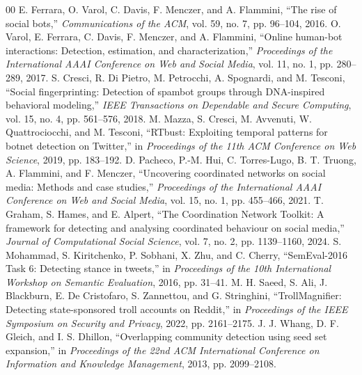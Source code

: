 \documentclass[conference]{IEEEtran}
\begin{document}
\begin{thebibliography}{00}
 E. Ferrara, O. Varol, C. Davis, F. Menczer, and A. Flammini, ``The rise of social bots,'' \textit{Communications of the ACM}, vol. 59, no. 7, pp. 96--104, 2016.
 O. Varol, E. Ferrara, C. Davis, F. Menczer, and A. Flammini, ``Online human-bot interactions: Detection, estimation, and characterization,'' \textit{Proceedings of the International AAAI Conference on Web and Social Media}, vol. 11, no. 1, pp. 280--289, 2017.
 S. Cresci, R. Di Pietro, M. Petrocchi, A. Spognardi, and M. Tesconi, ``Social fingerprinting: Detection of spambot groups through DNA-inspired behavioral modeling,'' \textit{IEEE Transactions on Dependable and Secure Computing}, vol. 15, no. 4, pp. 561--576, 2018.
 M. Mazza, S. Cresci, M. Avvenuti, W. Quattrociocchi, and M. Tesconi, ``RTbust: Exploiting temporal patterns for botnet detection on Twitter,'' in \textit{Proceedings of the 11th ACM Conference on Web Science}, 2019, pp. 183--192.
 D. Pacheco, P.-M. Hui, C. Torres-Lugo, B. T. Truong, A. Flammini, and F. Menczer, ``Uncovering coordinated networks on social media: Methods and case studies,'' \textit{Proceedings of the International AAAI Conference on Web and Social Media}, vol. 15, no. 1, pp. 455--466, 2021.
 T. Graham, S. Hames, and E. Alpert, ``The Coordination Network Toolkit: A framework for detecting and analysing coordinated behaviour on social media,'' \textit{Journal of Computational Social Science}, vol. 7, no. 2, pp. 1139--1160, 2024.
 S. Mohammad, S. Kiritchenko, P. Sobhani, X. Zhu, and C. Cherry, ``SemEval-2016 Task 6: Detecting stance in tweets,'' in \textit{Proceedings of the 10th International Workshop on Semantic Evaluation}, 2016, pp. 31--41.
 M. H. Saeed, S. Ali, J. Blackburn, E. De Cristofaro, S. Zannettou, and G. Stringhini, ``TrollMagnifier: Detecting state-sponsored troll accounts on Reddit,'' in \textit{Proceedings of the IEEE Symposium on Security and Privacy}, 2022, pp. 2161--2175.
 J. J. Whang, D. F. Gleich, and I. S. Dhillon, ``Overlapping community detection using seed set expansion,'' in \textit{Proceedings of the 22nd ACM International Conference on Information and Knowledge Management}, 2013, pp. 2099--2108.
\end{thebibliography}
\end{document}

